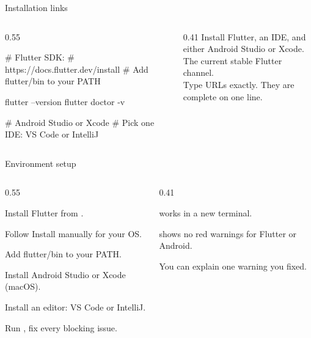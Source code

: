 \documentclass[10pt,aspectratio=169,t]{beamer}
\begin{document}
\begin{frame}[fragile,eyebrow=Setup]{Installation links}
  \begin{columns}[T]
    \begin{column}{0.55\textwidth}
\begin{shell}
# Flutter SDK:
# https://docs.flutter.dev/install
# Add flutter/bin to your PATH

flutter --version
flutter doctor -v

# Android Studio or Xcode
# Pick one IDE: VS Code or IntelliJ
\end{shell}
    \end{column}
    \begin{column}{0.41\textwidth}
      Install Flutter, an IDE, and either Android Studio or Xcode.
      \\[2mm]
      The current stable Flutter channel.
      \\[2mm]
      Type URLs exactly. They are complete on one line.
    \end{column}
  \end{columns}
\end{frame}

\begin{frame}[eyebrow=Task I]{Environment setup}
  \begin{columns}[T]
    \begin{column}{0.55\textwidth}
      \begin{steps}
        \item Install Flutter from .
        \item Follow Install manually for your OS.
        \item Add flutter/bin to your PATH.
        \item Install Android Studio or Xcode (macOS).
        \item Install an editor: VS Code or IntelliJ.
        \item Run , fix every blocking issue.
      \end{steps}
    \end{column}
    \begin{column}{0.41\textwidth}
      \begin{checklist}
        \item {} works in a new terminal.
        \item {} shows no red warnings for Flutter or Android.
        \item You can explain one warning you fixed.
      \end{checklist}
    \end{column}
  \end{columns}
\end{frame}
\end{document}
